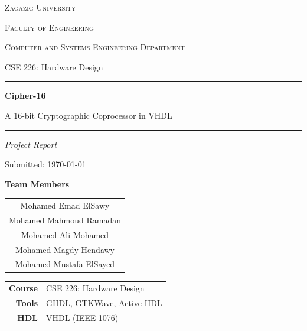 \documentclass[11pt,a4paper]{article}
\begin{document}
\begin{titlepage}
  \centering
  \vspace*{1cm}

  {\scshape\Large Zagazig University \par}
  {\scshape\large Faculty of Engineering \par}
  {\scshape\large Computer and Systems Engineering Department \par}
  \vspace{0.4cm}
  {\large CSE 226: Hardware Design \par}

  \vspace{2.5cm}
  \rule{\linewidth}{0.5pt}\par
  \vspace{0.8cm}
  {\huge\bfseries Cipher-16 \par}
  \vspace{0.4cm}
  {\Large A 16-bit Cryptographic Coprocessor in VHDL \par}
  \vspace{0.6cm}
  \rule{\linewidth}{0.5pt}\par

  \vspace{1.5cm}
  {\large\itshape Project Report \par}
  \vspace{0.3cm}
  {\large Submitted: \today \par}

  \vspace{1.5cm}

  {\large\bfseries Team Members \par}
  \vspace{0.4cm}
  \begin{tabular}{c}
    Mohamed Emad ElSawy \\[2pt]
    Mohamed Mahmoud Ramadan \\[2pt]
    Mohamed Ali Mohamed \\[2pt]
    Mohamed Magdy Hendawy \\[2pt]
    Mohamed Mustafa ElSayed \\
  \end{tabular}

  \vfill

  \begin{tabular}{rl}
    \textbf{Course} & CSE 226: Hardware Design \\
    \textbf{Tools}  & GHDL, GTKWave, Active-HDL \\
    \textbf{HDL}    & VHDL (IEEE 1076) \\
  \end{tabular}

  \vspace{1cm}
\end{titlepage}
\end{document}
